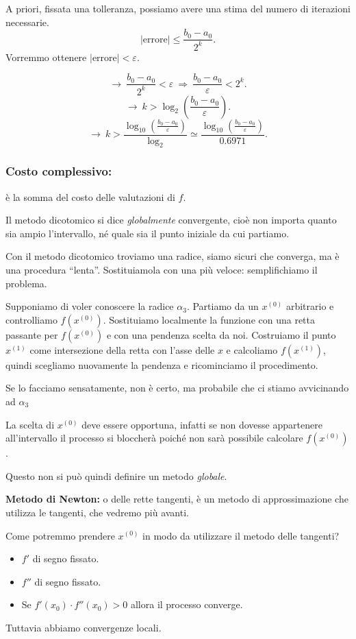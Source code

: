A priori, fissata una tolleranza, possiamo avere una stima del numero di
iterazioni necessarie.
\[|\textrm{errore}| \leq \frac{b_0 - a_0}{2^k}.\]
Vorremmo ottenere $|\textrm{errore}|< \varepsilon$.

\[\longrightarrow \ 
\frac{b_0 - a_0}{2^k} < \varepsilon \ \Longrightarrow \ 
\frac{b_0 - a_0}{\varepsilon} < 2^k.
\]
\[\longrightarrow \ 
k > \log_2\left(\frac{b_0 - a_0}{\varepsilon}\right).
\]
\[\longrightarrow \ 
k > \frac{\log_{10}\left(\frac{b_0 - a_0}{\varepsilon}\right)}{\log_2}
\simeq \frac{\log_{10}\left(\frac{b_0 - a_0}{\varepsilon}\right)}{0.6971}.
\]
\subsubsection{Costo complessivo:}
è la somma del costo delle valutazioni di $f$.

\begin{osse}
Il metodo dicotomico si dice \emph{globalmente} convergente, cioè non
importa quanto sia ampio l'intervallo, né quale sia il punto iniziale
da cui partiamo.
\end{osse}

Con il metodo dicotomico troviamo una radice, siamo sicuri che converga, ma
è una procedura ``lenta''. Sostituiamola con una più veloce: semplifichiamo il
problema.

Supponiamo di voler conoscere la radice $\alpha_3$. Partiamo da un $x^{(0)}$
arbitrario e controlliamo $f(x^{(0)})$. Sostituiamo localmente la funzione
con una retta passante per $f(x^{(0)})$ e con una pendenza scelta da noi.
Costruiamo il punto $x^{(1)}$ come intersezione della retta con l'asse delle
$x$ e calcoliamo $f(x^{(1)})$, quindi scegliamo nuovamente la pendenza e
ricominciamo il procedimento.

Se lo facciamo sensatamente, non è certo, ma probabile che ci stiamo 
avvicinando ad $\alpha_3$

\begin{osse}
La scelta di $x^{(0)}$ deve essere opportuna, infatti se non dovesse 
appartenere all'intervallo il processo si bloccherà poiché non sarà possibile
calcolare $f(x^{(0)})$.

Questo non si può quindi definire un metodo \emph{globale}.
\end{osse}

\textbf{Metodo di Newton:}
o delle rette tangenti, è un metodo di approssimazione che utilizza le 
tangenti, che vedremo più avanti. 

\begin{flushleft}
Come potremmo prendere $x^{(0)}$ in modo da utilizzare il metodo delle 
tangenti?
\end{flushleft}
\begin{itemize}
\item[]$f'$ di segno fissato.
\item[]$f''$ di segno fissato.
\item[]Se $f'(x_0)\cdot f''(x_0) > 0$ allora il processo converge.
\end{itemize}
Tuttavia abbiamo convergenze locali.

